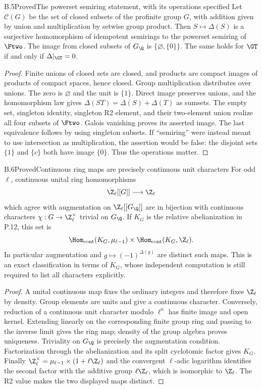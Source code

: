 \begin{statement}{B.5}{Proved}{The powerset semiring statement, with its operations specified}
Let $\mathscr C(G)$ be the set of closed subsets of the
profinite group $G$, with addition given by union and
multiplication by setwise group product. Then
$S\mapsto\Delta(S)$ is a surjective homomorphism of
idempotent semirings to the powerset semiring of $\Ftwo$.
The image from closed subsets of $G_{\Q}$ is
$\{\varnothing,\{0\}\}$. The same holds for $\GT$
if and only if $\Delta|_{\GT}=0$.
\end{statement}
\begin{proof}
Finite unions of closed sets are closed, and products
are compact images of products of compact spaces, hence
closed. Group multiplication distributes over unions.
The zero is $\varnothing$ and the unit is $\{1\}$.
Direct image preserves unions, and the homomorphism law
gives $\Delta(ST)=\Delta(S)+\Delta(T)$ as sumsets.
The empty set, singleton identity, singleton R2 element,
and their two-element union realize all four subsets of
$\Ftwo$. Galois vanishing proves its asserted image.
The last equivalence follows by using singleton subsets.
If ``semiring'' were instead meant to use intersection
as multiplication, the assertion would be false: the
disjoint sets $\{1\}$ and $\{c\}$ both have image
$\{0\}$. Thus the operations matter.
\end{proof}

\begin{statement}{B.6}{Proved}{Continuous ring maps are precisely continuous unit characters}
For odd $\ell$, continuous unital ring homomorphisms
\[
 \Z_\ell[[G]]\longrightarrow\Z_\ell
\]
which agree with augmentation on $\Z_\ell[[G_{\Q}]]$
are in bijection with continuous characters
$\chi:G\to\Z_\ell^\times$ trivial on $G_{\Q}$.
If $K_G$ is the relative abelianization in P.12,
this set is
\[
 \Hom_{\rm cont}(K_G,\mu_{\ell-1})
 \times\Hom_{\rm cont}(K_G,\Z_\ell).
\]
In particular augmentation and $g\mapsto(-1)^{\Delta(g)}$
are distinct such maps. This is an exact classification
in terms of $K_G$, whose independent computation is
still required to list all characters explicitly.
\end{statement}
\begin{proof}
A unital continuous map fixes the ordinary integers
and therefore fixes $\Z_\ell$ by density. Group
elements are units and give a continuous character.
Conversely, reduction of a continuous unit character
modulo $\ell^n$ has finite image and open kernel.
Extending linearly on the corresponding finite group
ring and passing to the inverse limit gives the ring
map; density of the group algebra proves uniqueness.
Triviality on $G_{\Q}$ is precisely the augmentation
condition. Factorization through the abelianization
and its split cyclotomic factor gives $K_G$.
Finally
$\Z_\ell^\times=\mu_{\ell-1}\times(1+\ell\Z_\ell)$
and the convergent $\ell$-adic logarithm identifies
the second factor with the additive group $\ell\Z_\ell$,
which is isomorphic to $\Z_\ell$. The R2 value makes
the two displayed maps distinct.
\end{proof}

